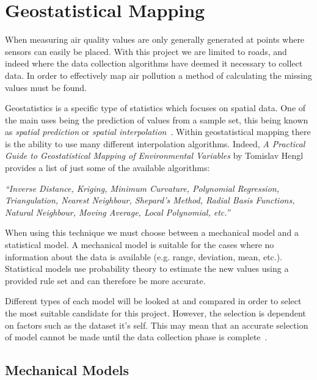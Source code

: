 \section{Geostatistical Mapping}\label{geostatistics}



When measuring air quality values are only generally generated at points where sensors can easily be placed. With this project we are limited to roads, and indeed where the data collection algorithms have deemed it necessary to collect data. In order to effectively map air pollution a method of calculating the missing values must be found.

Geostatistics is a specific type of statistics which focuses on spatial data. One of the main uses being the prediction of values from a sample set, this being known as \emph{spatial prediction} or \emph{spatial interpolation}~\cite{practicalguidestatisticalmapping}. Within geostatistical mapping there is the ability to use many different interpolation algorithms. Indeed, \emph{A Practical Guide to Geostatistical Mapping of Environmental Variables} by Tomislav Hengl provides a list of just some of the available algorithms: 

\emph{``Inverse Distance, Kriging, Minimum Curvature, Polynomial Regression, Triangulation, Nearest Neighbour, Shepard’s Method, Radial Basis Functions, Natural Neighbour, Moving Average, Local Polynomial, etc.''}

When using this technique we must choose between a mechanical model and a statistical model. A mechanical model is suitable for the cases where no information about the data is available (e.g. range, deviation, mean, etc.). Statistical models use probability theory to estimate the new values using a provided rule set and can therefore be more accurate. 

Different types of each model will be looked at and compared in order to select the most suitable candidate for this project. However, the selection is dependent on factors such as the dataset it's self. This may mean that an accurate selection of model cannot be made until the data collection phase is complete~\cite{mappingairpollutionusinggis}. 

\subsection{Mechanical Models}\label{mechanicalmodels}

